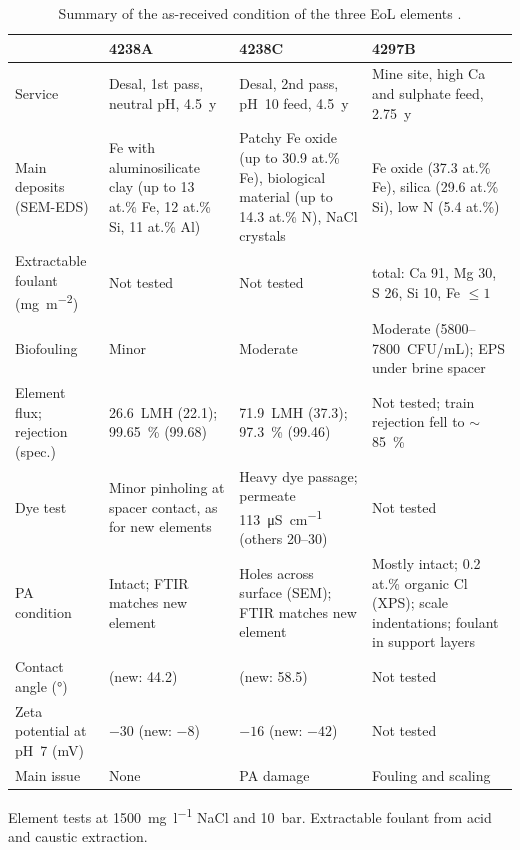 \begin{table}[htbp]
  \centering
  \caption{Summary of the as-received condition of the three EoL elements \citep{MembraneWorks2025Desal,MembraneWorks2026Mine}.}
  \label{tab:eol-summary}
  \small
  \begin{tabularx}{\textwidth}{@{}>{\raggedright\arraybackslash}p{}*{3}{>{\raggedright\arraybackslash}X}@{}}
    \toprule
    & \textbf{4238A} & \textbf{4238C} & \textbf{4297B} \\
    \midrule
    Service & Desal, 1st pass, neutral pH, 4.5~y
            & Desal, 2nd pass, pH~10 feed, 4.5~y
            & Mine site, high Ca and sulphate feed, 2.75~y\\
    \addlinespace
    Main deposits (SEM-EDS) & Fe with aluminosilicate clay (up to 13 at.\% Fe, 12 at.\% Si, 11 at.\% Al)
            & Patchy Fe oxide (up to 30.9 at.\% Fe), biological material (up to 14.3 at.\% N), NaCl crystals
            & Fe oxide (37.3 at.\% Fe), silica (29.6 at.\% Si), low N (5.4 at.\%) \\
    \addlinespace
    Extractable foulant (\unit{mg.m^{-2}}) & Not tested & Not tested
            & 237.5 total: Ca 91, Mg 30, S 26, Si 10, Fe $\leq 1$ \\
    \addlinespace
    Biofouling & Minor & Moderate
            & Moderate (5800--7800~CFU/mL); EPS under brine spacer \\
    \addlinespace
    Element flux; rejection (spec.) & \qty{26.6}{LMH} (22.1); \qty{99.65}{\percent} (99.68)
            & \qty{71.9}{LMH} (37.3); \qty{97.3}{\percent} (99.46)
            & Not tested; train rejection fell to $\sim$\qty{85}{\percent} \\
    \addlinespace
    Dye test & Minor pinholing at spacer contact, as for new elements
            & Heavy dye passage; permeate \qty{113}{\micro\siemens\per\centi\metre} (others 20--30)
            & Not tested \\
    \addlinespace
    PA condition & Intact; FTIR matches new element
            & Holes across surface (SEM); FTIR matches new element
            & Mostly intact; 0.2 at.\% organic Cl (XPS); scale indentations; foulant in support layers \\
    \addlinespace
    Contact angle (\unit{\degree}) & 25.1 (new: 44.2) & 34.5 (new: 58.5) & Not tested \\
    \addlinespace
    Zeta potential at pH~7 (\unit{mV}) & $-30$ (new: $-8$) & $-16$ (new: $-42$) & Not tested \\
    \addlinespace
    Main issue & None & PA damage & Fouling and scaling \\
    \bottomrule
  \end{tabularx}
  \par\smallskip
  \footnotesize Element tests at \qty{1500}{\milli\gram\per\litre} NaCl and \qty{10}{bar}. Extractable foulant from acid and caustic extraction.
\end{table}

